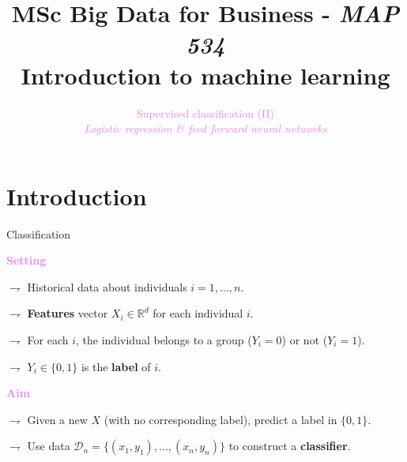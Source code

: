 \documentclass[9pt]{beamer}
\title[Introduction to machine learning]{MSc Big Data for Business - {\em MAP 534} \\
Introduction to machine learning\\}
\author{}
\date{}
\newcommand\R{\mathds{R}}
\begin{document}
\author[S. Le Corff]{\textcolor{violet}{Supervised classification (II)}\\ {\em {\small \textcolor{violet}{Logistic regression \& feed forward neural networks}}}}

\begin{frame}
\titlepage
\end{frame}

\section{Introduction}
\begin{frame}{Classification}

\textcolor{violet}{{\bf Setting}}

$\rightharpoondown$ Historical data  about \alert{individuals $i=1, \ldots, n$}.

$\rightharpoondown$ \textbf{Features} vector $X_i \in \R^d$ for each individual $i$.

$\rightharpoondown$ For each $i$, the individual \alert{belongs to a group} ($Y_i = 0$) or not ($Y_i = 1$).

$\rightharpoondown$ $Y_i \in \{ 0, 1 \}$ is  the \textbf{label} of $i$.


\vspace{.6cm}

\textcolor{violet}{{\bf Aim}}

$\rightharpoondown$ Given a new $X$ (with no corresponding label), \alert{predict a label in $\{ 0, 1 \}$}.

$\rightharpoondown$ Use data $\mathcal{D}_n = \{ (x_1, y_1), \ldots, (x_n, y_n) \}$ \alert{to construct a  \textbf{classifier}}.

\end{frame}
\end{document}
